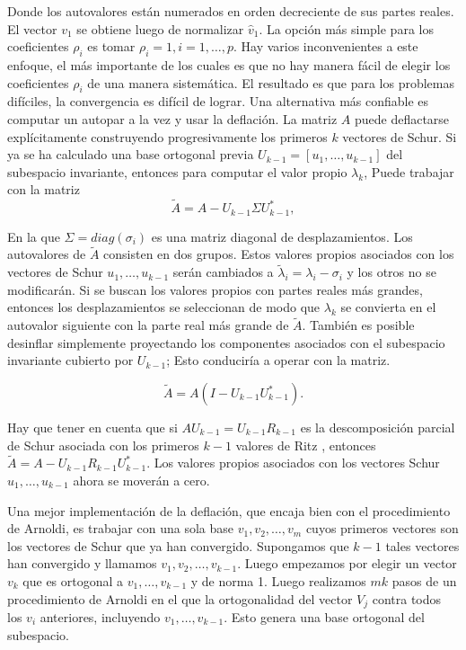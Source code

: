 \documentclass[a4paper,openright,12pt, oneside]{book}
\begin{document}
Donde los autovalores est\'an numerados en orden decreciente de sus partes reales. El vector $ v_1 $ se obtiene luego de normalizar $ \hat v_1 $. La opci\'on m\'as simple para los coeficientes $ \rho_i $ es tomar $ \rho_i = 1, i = 1, \ldots, p $. Hay varios inconvenientes a este enfoque, el m\'as importante de los cuales es que no hay manera f\'acil de elegir los coeficientes $ \rho_i $ de una manera sistem\'atica. El resultado es que para los problemas dif\'iciles, la convergencia es dif\'icil de lograr.
Una alternativa m\'as confiable es computar un autopar a la vez y usar la deflaci\'on. La matriz $ A $ puede deflactarse expl\'icitamente construyendo progresivamente los primeros $ k $ vectores de Schur. Si ya se ha calculado una base ortogonal previa $ U_ {k-1} = [u_1, \ldots, u_ {k-1}] $ del subespacio invariante, entonces para computar el valor propio $ \lambda_{k} $, Puede trabajar con la matriz
\begin{displaymath}
\tilde A = A - U_{k-1} \Sigma U_{k-1}^{\ast}, 
\end{displaymath}


En la que $\Sigma = diag(\sigma_i)$ es una matriz diagonal de desplazamientos. Los autovalores de $ \tilde A $ consisten en dos grupos. Estos valores propios asociados con los vectores de Schur $ u_1, 
\ldots, u_{k-1} $ ser\'an cambiados a $ \tilde \lambda_i = \lambda_i - \sigma_i $ y los otros no se modificar\'an. Si se buscan los valores propios con partes reales m\'as grandes, entonces los desplazamientos se seleccionan de modo que $ \lambda_k $ se convierta en el autovalor siguiente con la parte real m\'as grande de $ \tilde A $. Tambi\'en es posible desinflar simplemente proyectando los componentes asociados con el subespacio invariante cubierto por $ U_ {k-1} $; Esto conducir\'ia a operar con la matriz.

\begin{displaymath}
\tilde A = A (I - U_{k-1} U_{k-1}^{\ast}).
\end{displaymath}

Hay que tener en cuenta que si $ A U_{k-1} = U_ {k-1} R_ {k-1} $ es la descomposici\'on parcial de Schur asociada con los primeros $ k-1 $ valores de Ritz , entonces $ \tilde A = A - U_ {k-1} R_ {k-1} U_ {k-1} ^ {\ast} $. Los valores propios asociados con los vectores Schur $ u_1, \ldots, u_ {k-1} $ ahora se mover\'an a cero.

Una mejor implementaci\'on de la deflaci\'on, que encaja bien con el procedimiento de Arnoldi, es trabajar con una sola base $ v_1, v_2, \ldots, v_m $ cuyos primeros vectores son los vectores de Schur que ya han convergido. Supongamos que $ k-1 $ tales vectores han convergido y llamamos $ v_1, v_2
, \ldots, v_ {k-1} $. Luego empezamos por elegir un vector $ v_k $ que es ortogonal a $ v_1, \ldots, v_ {k-1} $ y de norma 1. Luego realizamos $ mk $ pasos de un procedimiento de Arnoldi en el que la ortogonalidad del vector $ V_j $ contra todos los $ v_i $ anteriores, incluyendo $ v_1, \ldots, v_ {k-1} $. Esto genera una base ortogonal del subespacio. 
\end{document}

